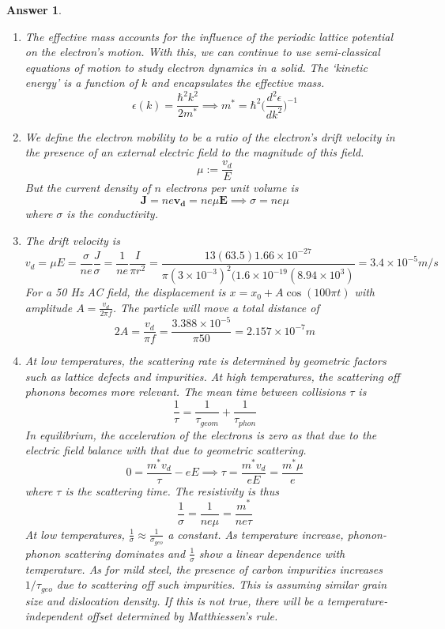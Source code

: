 \documentclass[a4paper]{article}
\newtheorem{ans}{Answer}[subsection]
\theoremstyle{new}
\begin{document}
\newpage
\begin{ans}\leavevmode
\begin{enumerate}[label=(\alph*)]
\item The effective mass accounts for the influence of the periodic lattice potential on the electron's motion. With this, we can continue to use semi-classical equations of motion to study electron dynamics in a solid. The `kinetic energy' is a function of $k$ and encapsulates the effective mass.
$$\epsilon(k)=\frac{\hbar^2k^2}{2m^*}\implies m^*=\hbar^2\bigg(\frac{d^2\epsilon}{dk^2}\bigg)^{-1}$$
\item We define the electron mobility to be a ratio of the electron's drift velocity in the presence of an external electric field to the magnitude of this field.
$$\mu:=\frac{v_d}{E}$$
But the current density of $n$ electrons per unit volume is
$$\mathbf{J}=ne\mathbf{v_d}=ne\mu\mathbf{E}\implies\sigma=ne\mu$$
where $\sigma$ is the conductivity.
\item The drift velocity is
$$v_d=\mu E=\frac{\sigma}{ne}\frac{J}{\sigma}=\frac{1}{ne}\frac{I}{\pi r^2}=\frac{13(63.5)1.66\times10^{-27}}{\pi(3\times10^{-3})^2(1.6\times10^{-19}(8.94\times10^3)}=3.4\times10^{-5}m/s$$
For a 50 Hz AC field, the displacement is $x=x_0+A\cos(100\pi t)$ with amplitude $A=\frac{v_d}{2\pi f}$. The particle will move a total distance of 
$$2A=\frac{v_d}{\pi f}=\frac{3.388\times10^{-5}}{\pi 50}=2.157\times10^{-7}m$$
\item At low temperatures, the scattering rate is determined by geometric factors such as lattice defects and impurities. At high temperatures, the scattering off phonons becomes more relevant. The mean time between collisions $\tau$ is
$$\frac{1}{\tau}=\frac{1}{\tau_{geom}}+\frac{1}{\tau_{phon}}$$
In equilibrium, the acceleration of the electrons is zero as that due to the electric field balance with that due to geometric scattering.
$$0=\frac{m^*v_d}{\tau}-eE\implies\tau=\frac{m^*v_d}{eE}=\frac{m^*\mu}{e}$$
where $\tau$ is the scattering time. The resistivity is thus
$$\frac{1}{\sigma}=\frac{1}{ne\mu}=\frac{m^*}{ne\tau}$$
At low temperatures, $\frac{1}{\sigma}\approx\frac{1}{\sigma_{geo}}$ a constant. As temperature increase, phonon-phonon scattering dominates and $\frac{1}{\sigma}$ show a linear dependence with temperature. As for mild steel, the presence of carbon impurities increases $1/\tau_{geo}$ due to scattering off such impurities. This is assuming similar grain size and dislocation density. If this is not true, there will be a temperature-independent offset determined by Matthiessen's rule.
\end{enumerate}
\end{ans}
\newpage
\end{document}
